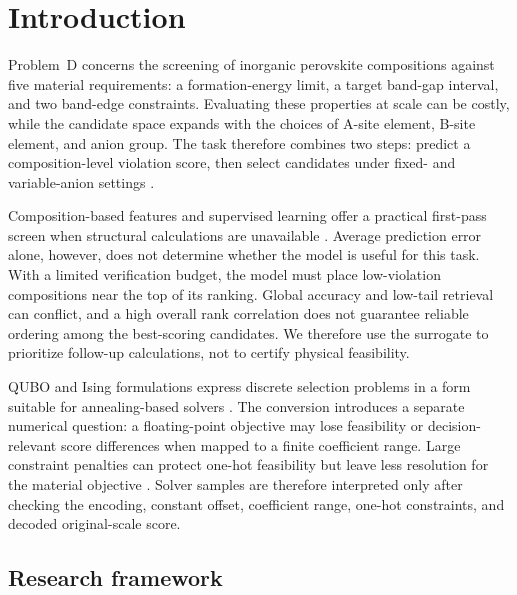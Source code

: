 \section{Introduction}
\label{sec:introduction}

Problem~D concerns the screening of inorganic perovskite compositions
against five material requirements: a formation-energy limit, a target
band-gap interval, and two band-edge constraints.  Evaluating these
properties at scale can be costly, while the candidate space expands with
the choices of A-site element, B-site element, and anion group.  The task
therefore combines two steps: predict a composition-level violation score,
then select candidates under fixed- and variable-anion settings
\cite{apmcm2026problemD}.

Composition-based features and supervised learning offer a practical
first-pass screen when structural calculations are unavailable
\cite{Ward2016Magpie,Chen2024PerovskiteML}.  Average prediction error alone,
however, does not determine whether the model is useful for this task.  With
a limited verification budget, the model must place low-violation
compositions near the top of its ranking.  Global accuracy and low-tail
retrieval can conflict, and a high overall rank correlation does not
guarantee reliable ordering among the best-scoring candidates.  We therefore
use the surrogate to prioritize follow-up calculations, not to certify
physical feasibility.

QUBO and Ising formulations express discrete selection problems in a
form suitable for annealing-based solvers
\cite{Lucas2014IsingNP,Glover2019QUBOTutorial}.  The conversion introduces
a separate numerical question: a floating-point objective may lose
feasibility or decision-relevant score differences when mapped to a finite
coefficient range.  Large constraint penalties can protect one-hot
feasibility but leave less resolution for the material objective
\cite{Ceselli2023GoodQUBOEncodings,Muecke2025OptimumPreservingQUBO}.
Solver samples are therefore interpreted only after checking the encoding,
constant offset, coefficient range, one-hot constraints, and decoded
original-scale score.

\subsection{Research framework}

